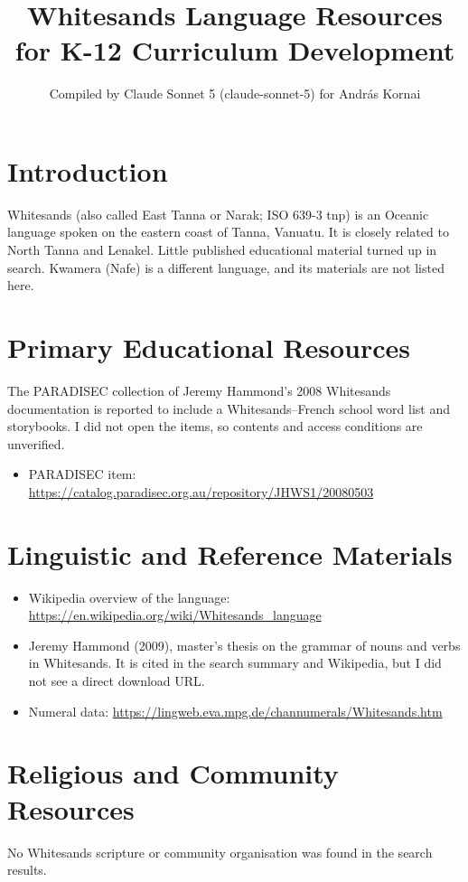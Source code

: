 \documentclass[12pt]{article}
\title{Whitesands Language Resources for K-12 Curriculum Development}
\author{Compiled by Claude Sonnet 5 (claude-sonnet-5) for Andr\'as Kornai}
\date{}
\begin{document}
\maketitle

\section{Introduction}
Whitesands (also called East Tanna or Narak; ISO 639-3 tnp) is an Oceanic language spoken on the eastern coast of Tanna, Vanuatu. It is closely related to North Tanna and Lenakel. Little published educational material turned up in search. Kwamera (Nafe) is a different language, and its materials are not listed here.

\section{Primary Educational Resources}
The PARADISEC collection of Jeremy Hammond's 2008 Whitesands documentation is reported to include a Whitesands--French school word list and storybooks. I did not open the items, so contents and access conditions are unverified.
\begin{itemize}
\item PARADISEC item: \url{https://catalog.paradisec.org.au/repository/JHWS1/20080503}
\end{itemize}

\section{Linguistic and Reference Materials}
\begin{itemize}
\item Wikipedia overview of the language: \url{https://en.wikipedia.org/wiki/Whitesands_language}
\item Jeremy Hammond (2009), master's thesis on the grammar of nouns and verbs in Whitesands. It is cited in the search summary and Wikipedia, but I did not see a direct download URL.
\item Numeral data: \url{https://lingweb.eva.mpg.de/channumerals/Whitesands.htm}
\end{itemize}

\section{Religious and Community Resources}
No Whitesands scripture or community organisation was found in the search results.
\end{document}

